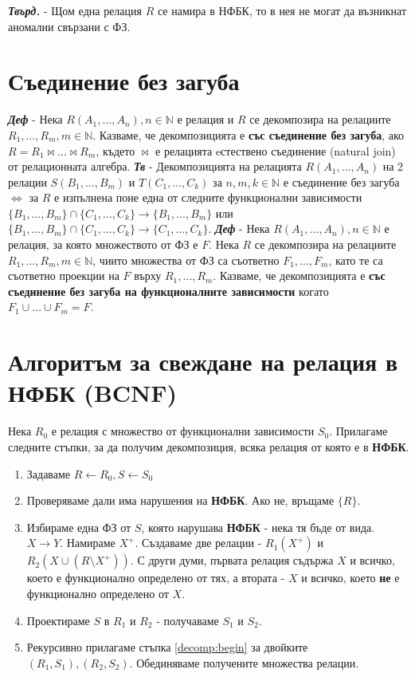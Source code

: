 \documentclass[fleqn,12pt]{article}
\begin{document}
\textbf{\textit{Твърд.}} - Щом една релация $R$ се намира в НФБК, то в нея не могат да възникнат аномалии свързани с ФЗ.

\section{Съединение без загуба}

\textbf{\textit{Деф}} - Нека $R(A_1, \dots, A_n), n \in \mathbb{N}$ е релация и $R$ се декомпозира на релациите $R_1, \dots, R_m, m \in \mathbb{N}$.
Казваме, че декомпозицията е \textbf{със съединение без загуба}, ако $R = R_1 \bowtie \dots \bowtie R_m$, където $\bowtie$ е релацията eстествено съединение (natural join) от релационната алгебра.
\bigbreak
\textbf{\textit{Тв}} - Декомпозицията на релацията $R(A_1, \dots, A_n)$ на 2 релации $S(B_1, \dots, B_m)$ и $T(C_1, \dots, C_k)$ за $n, m, k \in \mathbb{N}$ е съединение без загуба $\iff$ за $R$ е изпълнена поне една от следните функционални зависимости $\{B_1, \dots, B_m\} \cap \{C_1, \dots, C_k\} \rightarrow \{B_1, \dots, B_m\}$ или $\{B_1, \dots, B_m\} \cap \{C_1, \dots, C_k\} \rightarrow \{C_1, \dots, C_k\}$.
\bigbreak
\textbf{\textit{Деф}} - Нека $R(A_1, \dots, A_n), n \in \mathbb{N}$ е релация, за която множеството от ФЗ е $F$.
Нека $R$ се декомпозира на релациите $R_1, \dots, R_m, m \in \mathbb{N}$, чиито множества от ФЗ са съответно $F_1, \dots, F_m$, като те са съответно проекции на $F$ върху $R_1, \dots, R_m$.
Казваме, че декомпозицията е \textbf{със съединение без загуба на функционалните зависимости} когато $F_1 \cup \dots \cup F_m = F$.
\bigbreak

\section{Алгоритъм за свеждане на релация в НФБК (BCNF)}
Нека $R_0$ е релация с множество от функционални зависимости $S_0$.
Прилагаме следните стъпки, за да получим декомпозиция, всяка релация от която е в \textbf{НФБК}.
\begin{enumerate}
    \item Задаваме $R \leftarrow R_0, S \leftarrow S_0$
    \item \label{decomp:begin} Проверяваме дали има нарушения на \textbf{НФБК}. Ако не, връщаме $\{R\}$.
    \item Избираме една ФЗ от $S$, която нарушава \textbf{НФБК} - нека тя бъде от вида. $X \rightarrow Y$.
    Намираме $X^+$. Създаваме две релации - $R_1(X^+)$ и $R_2(X \cup (R \setminus X^+))$.
    С други думи, първата релация съдържа $X$ и всичко, което е функционално определено от тях, а втората 
    - $X$ и всичко, което \textbf{не} е функционално определено от $X$.
    \item \label{decomp:project} Проектираме $S$ в $R_1$ и $R_2$ - получаваме $S_1$ и $S_2$.
    \item Рекурсивно прилагаме стъпка \ref{decomp:begin} за двойките $(R_1, S_1), (R_2, S_2)$.
    Обединяваме получените множества релации. 
\end{enumerate}
\end{document}

